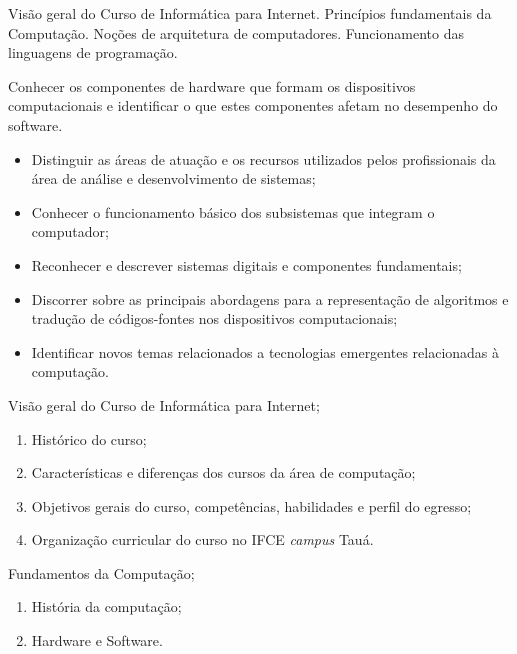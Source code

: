 \begin{pud}
	
	
	\ementa
	Visão geral do Curso de Informática para Internet. Princípios fundamentais da Computação. Noções de arquitetura de computadores. Funcionamento das linguagens de programação.

	\objetivos
	Conhecer os componentes de hardware que formam os dispositivos computacionais e identificar o que estes componentes afetam no desempenho do software.
	\begin{itemize}
	  \item Distinguir as áreas de atuação e os recursos utilizados pelos profissionais da área de análise e desenvolvimento de sistemas;
	  \item Conhecer o funcionamento básico dos subsistemas que integram o computador;
	  \item Reconhecer e descrever sistemas digitais e componentes fundamentais;
	  \item Discorrer sobre as principais abordagens para a representação de algoritmos e tradução de códigos-fontes nos dispositivos computacionais;
	  \item Identificar novos temas relacionados a tecnologias emergentes relacionadas à computação.
	\end{itemize}
	
	
	
	\programa	
	\begin{description}[itemsep=0em]
	   
	   \item[UNIDADE I:]  Visão geral do Curso de Informática para Internet;
	   \begin{enumerate}[itemsep=0em, topsep=0em]
	     \item Histórico do curso;
	     \item Características e diferenças dos cursos da área de computação;
	     \item Objetivos gerais do curso, competências, habilidades e perfil do egresso;
	     \item Organização curricular do curso no IFCE \textit{campus} Tauá.
	   \end{enumerate}
	   
	   \item[UNIDADE II:] Fundamentos da Computação;
	   \begin{enumerate}[itemsep=0em, topsep=0em]
	     \item História da computação;
	     \item Hardware e Software.
	   \end{enumerate}
	   

\end{description}
\end{pud}
